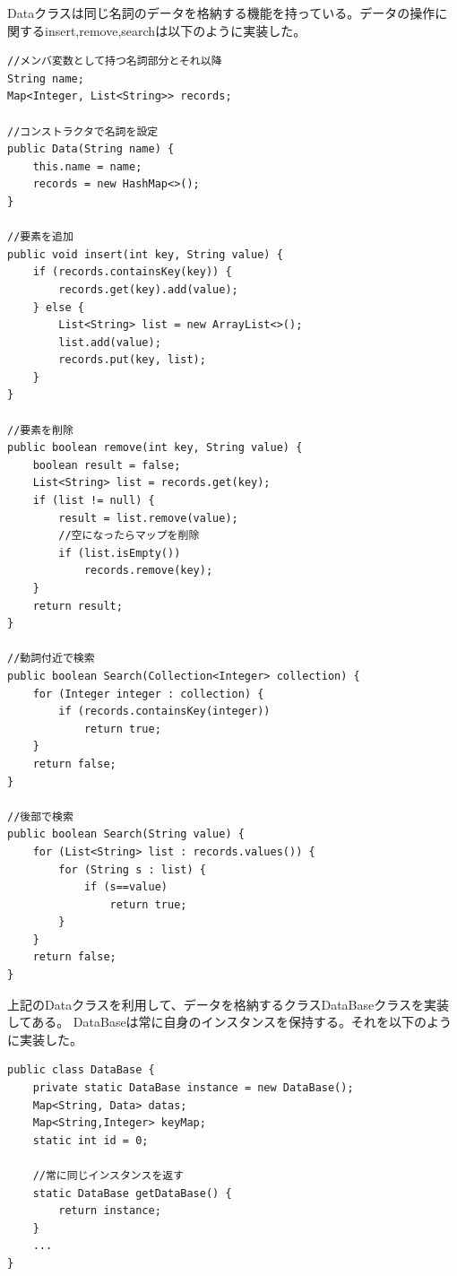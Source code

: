 \documentclass{jarticle}
\begin{document}
Dataクラスは同じ名詞のデータを格納する機能を持っている。データの操作に関するinsert,remove,searchは以下のように実装した。
\begin{lstlisting}[caption=Dataのデータ操作関連のメソッド,label=src:DataControl]
//メンバ変数として持つ名詞部分とそれ以降
String name;
Map<Integer, List<String>> records;

//コンストラクタで名詞を設定
public Data(String name) {
	this.name = name;
	records = new HashMap<>();
}

//要素を追加
public void insert(int key, String value) {
	if (records.containsKey(key)) {
		records.get(key).add(value);
	} else {
		List<String> list = new ArrayList<>();
		list.add(value);
		records.put(key, list);
	}
}

//要素を削除
public boolean remove(int key, String value) {
	boolean result = false;
	List<String> list = records.get(key);
	if (list != null) {
		result = list.remove(value);
        //空になったらマップを削除
		if (list.isEmpty())
			records.remove(key);
	}
	return result;
}

//動詞付近で検索
public boolean Search(Collection<Integer> collection) {
	for (Integer integer : collection) {
		if (records.containsKey(integer))
			return true;
	}
	return false;
}

//後部で検索
public boolean Search(String value) {
	for (List<String> list : records.values()) {
		for (String s : list) {
			if (s==value)
				return true;
		}
	}
	return false;
}
\end{lstlisting}

上記のDataクラスを利用して、データを格納するクラスDataBaseクラスを実装してある。
DataBaseは常に自身のインスタンスを保持する。それを以下のように実装した。
\begin{lstlisting}[caption=DataBaseのインスタンス保持,label=src:DataBaseInstance]
public class DataBase {
	private static DataBase instance = new DataBase();
	Map<String, Data> datas;
	Map<String,Integer> keyMap;
	static int id = 0;

	//常に同じインスタンスを返す
	static DataBase getDataBase() {
		return instance;
	}
    ...
}
\end{lstlisting}
\end{document}

